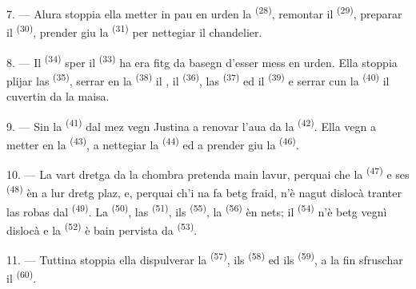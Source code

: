 7. --- Alura stoppia ella metter in pau en urden la 
\textsuperscript{(28)}, remontar il  \textsuperscript{(29)},
preparar il  \textsuperscript{(30)}, prender giu la
 \textsuperscript{(31)} per nettegiar il chandelier.

\VUsaut{5.0mm}
\VUsaut{3.0mm}

8. --- Il  \textsuperscript{(34)} sper il 
\textsuperscript{(33)} ha era fitg da basegn d'esser mess en urden. Ella stoppia
plijar las  \textsuperscript{(35)}, serrar en la  \textsuperscript{(38)} il , il 
\textsuperscript{(36)}, las  \textsuperscript{(37)} ed il
 \textsuperscript{(39)} e serrar cun la 
\textsuperscript{(40)} il cuvertin da la maisa.

9. --- Sin la  \textsuperscript{(41)} dal mez vegn Justina a
renovar l'aua da la  \textsuperscript{(42)}. Ella vegn a metter
 en la  \textsuperscript{(43)}, a nettegiar la
 \textsuperscript{(44)} ed a prender giu la
 \textsuperscript{(46)}.

10. --- La vart dretga da la chombra pretenda main lavur, perquai che la
 \textsuperscript{(47)} e ses 
\textsuperscript{(48)} èn a lur dretg plaz, e, perquai ch'i na fa betg fraid,
n'è nagut dislocà tranter las robas dal  \textsuperscript{(49)}. La
 \textsuperscript{(50)}, las  \textsuperscript{(51)}, ils
 \textsuperscript{(55)}, la 
\textsuperscript{(56)} èn nets; il  \textsuperscript{(54)}
n'è betg vegnì dislocà e la  \textsuperscript{(52)} è bain
pervista da  \textsuperscript{(53)}.


11. --- Tuttina stoppia ella dispulverar la  \textsuperscript{(57)},
ils  \textsuperscript{(58)} ed ils 
\textsuperscript{(59)}, a la fin sfruschar il  \textsuperscript{(60)}.

